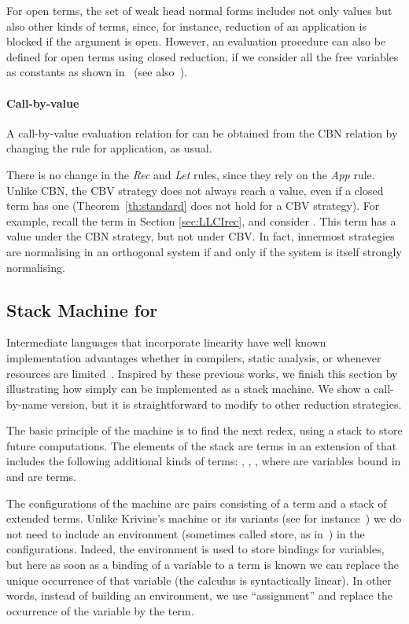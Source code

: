 \documentclass{article}
\begin{document}
For open terms, the set of weak head normal forms includes not only
values but also other kinds of terms, since, for instance, reduction
of an application is blocked if the argument is open.  However, an evaluation procedure can also be defined for open terms using closed reduction, if we
consider all the free variables as constants as shown
in~\cite{fernandezM:clores} (see also~\cite{BergerU91}).

\paragraph{Call-by-value}
A call-by-value evaluation relation for \LLCIrec can be obtained
from the CBN relation by changing the rule for application, as usual.





There is no change in the  \emph{Rec} and \emph{Let} rules, since they
rely on the \emph{App} rule.  Unlike CBN, the CBV strategy does not always 
reach a value, even if a closed term has one (Theorem~\ref{th:standard} does not hold for a CBV strategy).
For example, recall the term  in Section \ref{sec:LLCIrec},
and consider . This
term has a value under the CBN strategy, but not under CBV.
In fact, innermost strategies are normalising in an orthogonal system
if and only if the system is itself strongly normalising.

\subsection{Stack Machine for \LLCIrec} 
Intermediate languages that incorporate linearity  have well 
known implementation advantages whether in compilers, static analysis, 
or whenever resources are limited~\cite{LafontY:linam,MackieIC:lilfpl,PittsAM:opeplp,David_WalkerChapter}. Inspired by these previous works, we 
finish this section by illustrating how simply \LLCIrec can be 
implemented as a stack machine. We show a call-by-name version, but it
is straightforward to modify to other reduction strategies.

The basic principle of the machine is to find the next redex, using a
stack  to store future computations.  The elements of the
stack are terms in an extension of  that includes the
following additional kinds of terms: , ,
, where  are variables bound in   and  are 
terms.

The configurations of the machine are pairs consisting of a term and a
stack of extended terms.  Unlike Krivine's machine or its variants
(see for instance~\cite{HankinC, Curien91, FernandezM:newdem}) we do
not need to include an environment (sometimes called store, as
in~\cite{David_WalkerChapter}) in the configurations. Indeed, the
environment is used to store bindings for variables, but here as soon
as a binding of a variable to a term is known we can replace the
unique occurrence of that variable (the calculus is syntactically
linear). In other words, instead of building an environment, we use
``assignment'' and replace the occurrence of the variable by the term.
\end{document}
